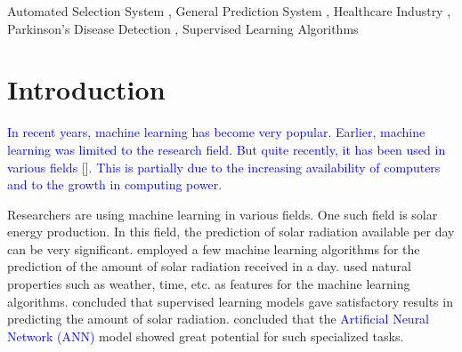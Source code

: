 \documentclass[a4paper,fleqn]{cas-dc}
\newcommand{\responsemodsm}[1]{\textcolor{blue}{#1}}
\begin{document}


\begin{keywords}
    Automated Selection System \sep
    General Prediction System \sep
    Healthcare Industry \sep
    Parkinson's Disease Detection \sep
    Supervised Learning Algorithms
\end{keywords}


\maketitle



\section{Introduction}\label{sec:introduciton}

\responsemodsm{In recent years, machine learning has become very popular. Earlier, machine learning was limited to the research field. But quite recently, it has been used in various fields [\citenum{ref_paper_36}]. This is partially due to the increasing availability of computers and to the growth in computing power.}

Researchers are using machine learning in various fields. One such field is solar energy production. In this field, the prediction of solar radiation available per day can be very significant. \cite*{ref_paper_7} employed a few machine learning algorithms for the prediction of the amount of solar radiation received in a day. \citeauthor{ref_paper_7} used natural properties such as weather, time, etc. as features for the machine learning algorithms. \citeauthor{ref_paper_7} concluded that supervised learning models gave satisfactory results in predicting the amount of solar radiation. \citeauthor{ref_paper_7} concluded that the \responsemodsm{Artificial Neural Network (ANN)} model showed great potential for such specialized tasks.
\end{document}
